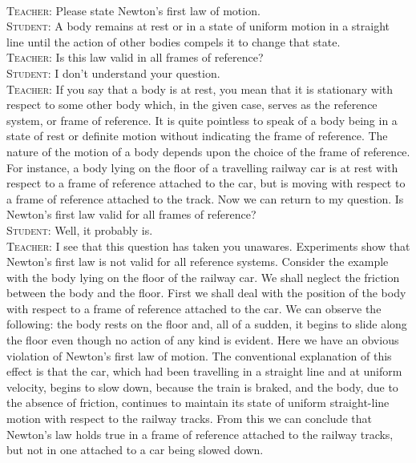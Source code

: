 \documentclass[a4paper,sfsidenotes]{tufte-book}
\begin{document}
\paragraph{}
\textsc{Teacher:} Please state Newton's first law of motion.\\
\textsc{Student:} A body remains at rest or in a state of uniform motion in a straight line until the action of other bodies compels it to change that state. \\
\textsc{Teacher:} Is this law valid in all frames of reference? \\
\textsc{Student:} I don't understand your question. \\
\textsc{Teacher:} If you say that a body is at rest, you mean that it is stationary with respect to some other body which, in the given case, serves as the reference system, or frame of reference. It
is quite pointless to speak of a body being in a state of rest or definite motion without indicating the frame of reference. The nature of the motion of a body depends upon the choice of the frame of reference. For instance, a body lying on the floor of a travelling railway car is at rest with respect to a
frame of reference attached to the car, but is moving with respect to a frame of reference attached to the track. Now we can return to my question. Is Newton's first law valid for all frames of reference?\\
\textsc{Student:} Well, it probably is.\\
\textsc{Teacher:} I see that this question has taken you unawares. Experiments show that Newton's first law is not valid for all reference systems. Consider the example with the body lying
on the floor of the railway car. We shall neglect the friction between the body and the floor. First we shall deal with the position of the body with respect to a frame of reference attached to the car. We can observe the following: the body rests on the floor and, all of a sudden, it begins to slide along the floor even though no action of any kind is evident. Here we have an obvious violation of Newton's first law of motion. The conventional explanation of this effect is that the car, which had been travelling in a straight line and at uniform velocity, begins to slow down, because the train is braked, and the body, due to the absence of friction, continues to maintain its state of uniform straight-line motion with respect to the railway tracks. From this we can conclude that Newton's law holds true in a frame of reference attached to the railway tracks, but not in one attached to a car being slowed down.
\end{document}
